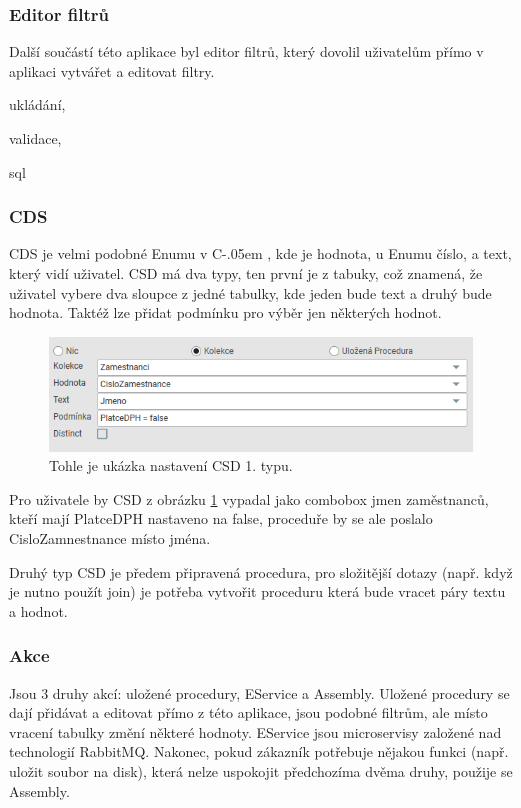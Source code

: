 \documentclass[czech,bachelor,dept460,male,csharp]{diploma}
\newcommand{\Csharp}{%
  {\settoheight{\dimen0}{C}C\kern-.05em \resizebox{!}{\dimen0}{\raisebox{\depth}{\#}}}}
\begin{document}
		\subsubsection{Editor filtrů}
			Další součástí této aplikace byl editor filtrů, který dovolil uživatelům přímo v aplikaci vytvářet a editovat filtry. 
			
			ukládání,
			
			validace, 
			
			sql		
		\subsubsection{CDS}
			CDS je velmi podobné Enumu v \Csharp, kde je hodnota, u Enumu číslo, a text, který vidí uživatel. CSD má dva typy, ten první je z tabuky, což znamená, že uživatel vybere dva sloupce z jedné tabulky, kde jeden bude text a druhý bude hodnota. Taktéž lze přidat podmínku pro výběr jen některých hodnot.
			\begin{figure}[h]
				\includegraphics{Figures/cds.png}
				\caption{Tohle je ukázka nastavení CSD 1. typu.}
    			\label{fig:CSDimg}
			\end{figure}
			
			Pro uživatele by CSD z obrázku \ref{fig:CSDimg} vypadal jako combobox jmen zaměstnanců, kteří mají PlatceDPH nastaveno na false, proceduře by se ale poslalo CisloZamnestnance místo jména.
			
			Druhý typ CSD je předem připravená procedura, pro složitější dotazy (např. když je nutno použít join) je potřeba vytvořit proceduru která bude vracet páry textu a hodnot.
		\subsubsection{Akce}
			Jsou 3 druhy akcí: uložené procedury, EService a Assembly. Uložené procedury se dají přidávat a editovat přímo z této aplikace, jsou podobné filtrům, ale místo vracení tabulky změní některé hodnoty. EService jsou microservisy založené nad technologií RabbitMQ. Nakonec, pokud zákazník potřebuje nějakou funkci (např. uložit soubor na disk), která nelze uspokojit předchozíma dvěma druhy, použije se Assembly.
			
\end{document}

